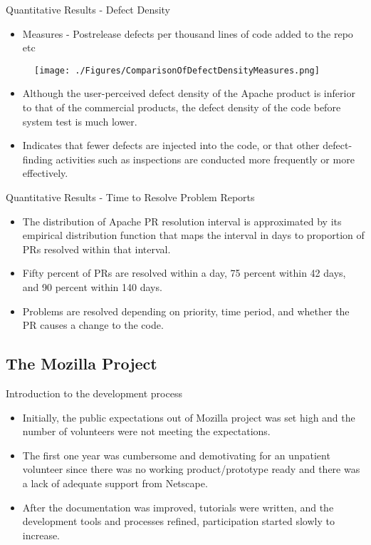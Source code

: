 \documentclass{beamer}
\begin{document}
\begin{frame}{Quantitative Results - Defect Density}
\begin{itemize}
	\item Measures - Postrelease defects per thousand lines of code added to the repo etc \pause
\end{itemize}
\begin{figure}
	\texttt{[image: ./Figures/ComparisonOfDefectDensityMeasures.png]}
\end{figure}
\begin{itemize}
	\item Although the user-perceived defect density of the Apache product is inferior to that of the commercial products, the defect density of the code before system test is much lower. \pause
	\item Indicates that fewer defects are injected into the code, or that other defect-finding activities such as inspections are conducted more frequently or more effectively.
\end{itemize}
\end{frame}

\begin{frame}{Quantitative Results - Time to Resolve Problem Reports}
\begin{itemize}
	\item The distribution of Apache PR resolution interval is approximated by its empirical distribution function that maps the interval in days to proportion of PRs resolved within that interval. \pause
	\item Fifty percent of PRs are resolved within a day, 75 percent within 42 days, and 90 percent within 140 days.\pause
	\item Problems are resolved depending on priority, time period, and whether the PR causes a change to the code.\pause
\end{itemize}
\end{frame}

\subsection{The Mozilla Project}
\begin{frame}{Introduction to the development process}
\begin{itemize}
	\item Initially, the public expectations out of Mozilla project was set high and the number of volunteers were not meeting the expectations.\pause
	\item The first one year was cumbersome and demotivating for an unpatient volunteer since there was no working product/prototype ready and there was a lack of adequate support from Netscape.\pause
	\item After the documentation was improved, tutorials were written, and the development tools and processes refined, participation started slowly to increase.
\end{itemize}
\end{frame}
\end{document}
